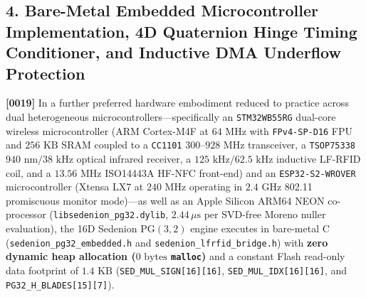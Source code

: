 \documentclass[12pt,letterpaper]{article}
\begin{document}
\subsection*{4. Bare-Metal Embedded Microcontroller Implementation, 4D Quaternion Hinge Timing Conditioner, and Inductive DMA Underflow Protection}
\textbf{[0019]} In a further preferred hardware embodiment reduced to practice across dual heterogeneous microcontrollers---specifically an \texttt{STM32WB55RG} dual-core wireless microcontroller (ARM Cortex-M4F at $64\text{ MHz}$ with \texttt{FPv4-SP-D16} FPU and $256\text{ KB}$ SRAM coupled to a \texttt{CC1101} $300\text{--}928\text{ MHz}$ transceiver, a \texttt{TSOP75338} $940\text{ nm}/38\text{ kHz}$ optical infrared receiver, a $125\text{ kHz}/62.5\text{ kHz}$ inductive LF-RFID coil, and a $13.56\text{ MHz}$ ISO14443A HF-NFC front-end) and an \texttt{ESP32-S2-WROVER} microcontroller (Xtensa LX7 at $240\text{ MHz}$ operating in $2.4\text{ GHz}$ 802.11 promiscuous monitor mode)---as well as an Apple Silicon ARM64 NEON co-processor (\texttt{libsedenion\_pg32.dylib}, $2.44\,\mu\text{s}$ per SVD-free Moreno nuller evaluation), the 16D Sedenion $\mathrm{PG}(3,2)$ engine executes in bare-metal C (\texttt{sedenion\_pg32\_embedded.h} and \texttt{sedenion\_lfrfid\_bridge.h}) with \textbf{zero dynamic heap allocation ($0\text{ bytes}$ \texttt{malloc})} and a constant Flash read-only data footprint of $1.4\text{ KB}$ (\texttt{SED\_MUL\_SIGN[16][16]}, \texttt{SED\_MUL\_IDX[16][16]}, and \texttt{PG32\_H\_BLADES[15][7]}).
\end{document}
